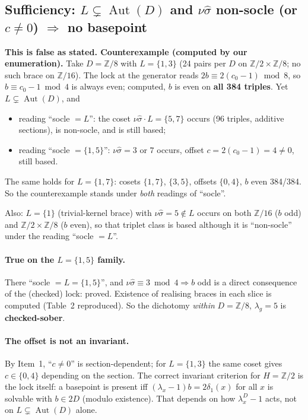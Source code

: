 \documentclass[11pt]{article}
\newcommand{\Z}{\mathbb{Z}}
\newcommand{\Aut}{\operatorname{Aut}}
\newcommand{\sh}{\hat\sigma}
\begin{document}
\subsection*{Sufficiency: $L\subsetneq\Aut(D)$ and $\nu\sh$ non-socle (or $c\neq0$) $\Rightarrow$ no basepoint}
\textbf{This is false as stated. Counterexample (computed by our enumeration).}
Take $D=\Z/8$ with $L=\{1,3\}$ (24 pairs per $D$ on $\Z/2\times\Z/8$; no such brace on
$\Z/16$). The lock at the generator reads $2b\equiv2(c_0-1)\bmod8$, so
$b\equiv c_0-1\bmod4$ is always even; computed, $b$ is even on \textbf{all 384 triples}.
Yet $L\subsetneq\Aut(D)$, and
\begin{itemize}[leftmargin=*]
\item reading ``socle $=L$'': the coset $\nu\sh\cdot L=\{5,7\}$ occurs (96 triples,
additive sections), is non-socle, and is still based;
\item reading ``socle $=\{1,5\}$'': $\nu\sh=3$ or $7$ occurs, offset $c=2(c_0-1)=4\neq0$,
still based.
\end{itemize}
The same holds for $L=\{1,7\}$: cosets $\{1,7\}$, $\{3,5\}$, offsets $\{0,4\}$, $b$ even
384/384. So the counterexample stands under \emph{both} readings of ``socle''.

Also: $L=\{1\}$ (trivial-kernel brace) with $\nu\sh=5\notin L$ occurs on both $\Z/16$
($b$ odd) and $\Z/2\times\Z/8$ ($b$ even), so that triplet class is based although it is
``non-socle'' under the reading ``socle $=L$''.

\paragraph{True on the $L=\{1,5\}$ family.} There ``socle $=L=\{1,5\}$'', and
$\nu\sh\equiv3\bmod4\Rightarrow b$ odd is a direct consequence of the (checked) lock:
proved. Existence of realising braces in each slice is computed (Table~2 reproduced). So
the dichotomy \emph{within} $D=\Z/8$, $\lambda_g=5$ is \textbf{checked-sober}.

\paragraph{The offset is not an invariant.} By Item~1, ``$c\neq0$'' is section-dependent;
for $L=\{1,3\}$ the same coset gives $c\in\{0,4\}$ depending on the section. The correct
invariant criterion for $H=\Z/2$ is the lock itself: a basepoint is present iff
$(\lambda_x-1)b=2\delta_1(x)$ for all $x$ is solvable with $b\in2D$ (modulo existence).
That depends on how $\lambda^D_x-1$ acts, not on $L\subsetneq\Aut(D)$ alone.
\end{document}
